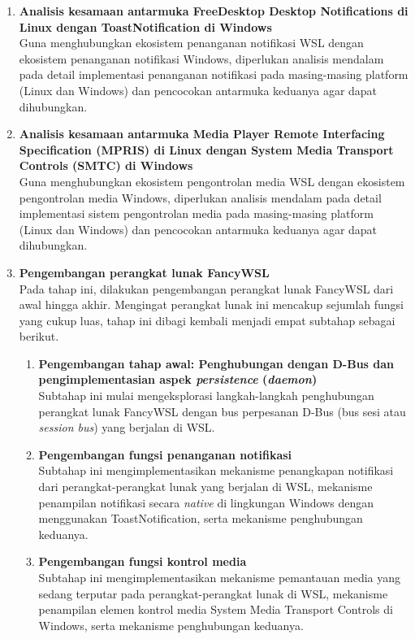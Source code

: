 \begin{enumerate}
    \item \textbf{Analisis kesamaan antarmuka FreeDesktop Desktop Notifications di Linux dengan ToastNotification di Windows}\\
    Guna menghubungkan ekosistem penanganan notifikasi WSL dengan ekosistem penanganan notifikasi Windows, diperlukan analisis mendalam pada detail implementasi penanganan notifikasi pada masing-masing platform (Linux dan Windows) dan pencocokan antarmuka keduanya agar dapat dihubungkan.

    \item \textbf{Analisis kesamaan antarmuka Media Player Remote Interfacing Specification (MPRIS) di Linux dengan System Media Transport Controls (SMTC) di Windows}\\
    Guna menghubungkan ekosistem pengontrolan media WSL dengan ekosistem pengontrolan media Windows, diperlukan analisis mendalam pada detail implementasi sistem pengontrolan media pada masing-masing platform (Linux dan Windows) dan pencocokan antarmuka keduanya agar dapat dihubungkan.

    \item \textbf{Pengembangan perangkat lunak FancyWSL}\\
    Pada tahap ini, dilakukan pengembangan perangkat lunak FancyWSL dari awal hingga akhir. Mengingat perangkat lunak ini mencakup sejumlah fungsi yang cukup luas, tahap ini dibagi kembali menjadi empat subtahap sebagai berikut.
    \begin{enumerate}
        \item \textbf{Pengembangan tahap awal: Penghubungan dengan D-Bus dan pengimplementasian aspek \textit{persistence} (\textit{daemon})}\\
        Subtahap ini mulai mengeksplorasi langkah-langkah penghubungan perangkat lunak FancyWSL dengan bus perpesanan D-Bus (bus sesi atau \textit{session bus}) yang berjalan di WSL.
        
        \item \textbf{Pengembangan fungsi penanganan notifikasi}\\
        Subtahap ini mengimplementasikan mekanisme penangkapan notifikasi dari perangkat-perangkat lunak yang berjalan di WSL, mekanisme penampilan notifikasi secara \textit{native} di lingkungan Windows dengan menggunakan ToastNotification, serta mekanisme penghubungan keduanya.

        \item \textbf{Pengembangan fungsi kontrol media}\\
        Subtahap ini mengimplementasikan mekanisme pemantauan media yang sedang terputar pada perangkat-perangkat lunak di WSL, mekanisme penampilan elemen kontrol media System Media Transport Controls di Windows, serta mekanisme penghubungan keduanya.


\end{enumerate}
\end{enumerate}

